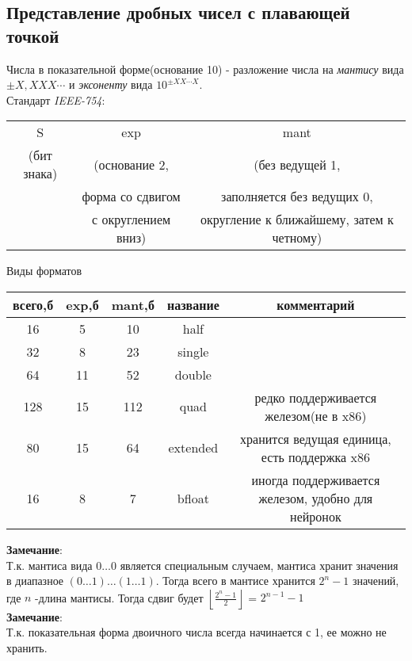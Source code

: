 \documentclass[12pt]{article}
\begin{document}
\subsection{Представление дробных чисел с плавающей точкой}
Числа в показательной форме(основание 10) - разложение числа на \textit{мантису} вида $\pm X,XXX\cdots$ и \textit{эксоненту} вида $10^{\pm XX\cdots X }$.\\
Стандарт \textit{IEEE-754}:\\
\begin{center}
    \begin{tabular}{|c|c|c|}
        \hline
        S & exp  & mant \\
        (бит знака) & (основание 2, & (без ведущей 1,\\
        & форма со сдвигом & заполняется без ведущих 0,\\
        & с округлением вниз) & округление к ближайшему, затем к четному)\\
        \hline
    \end{tabular}
\end{center}
Виды форматов
\begin{center}
    \begin{tabular}{c|c|c|c|c}
        всего,б & exp,б & mant,б & название & комментарий \\
        \hline
        16 & 5 & 10 & half &\\
        32 & 8 & 23 & single &\\
        64 & 11 & 52 & double &\\
        128 & 15 & 112 & quad & редко поддерживается железом(не в x86)\\
        \hline
        80 & 15 & 64 & extended & хранится ведущая единица, есть поддержка x86\\
        16 & 8 & 7 & bfloat & иногда поддерживается железом, удобно для нейронок
    \end{tabular}
\end{center}
\textbf{Замечание}:\\
Т.к. мантиса вида $0\ldots0$ является специальным случаем, мантиса хранит значения в диапазное $(0\ldots1)\ldots(1\ldots1)$. Тогда всего в мантисе хранится $2^n-1$ значений, где $n$ -длина мантисы. Тогда сдвиг будет $\left\lfloor\frac{2^n-1}2\right\rfloor$ = $2^{n-1}-1$\\
\textbf{Замечание}:\\
Т.к. показательная форма двоичного числа всегда начинается с 1, ее можно не хранить.\\\\
\end{document}
